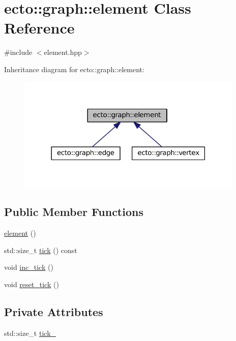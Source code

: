 \hypertarget{classecto_1_1graph_1_1element}{}\section{ecto\+:\+:graph\+:\+:element Class Reference}
\label{classecto_1_1graph_1_1element}


{\ttfamily \#include $<$element.\+hpp$>$}



Inheritance diagram for ecto\+:\+:graph\+:\+:element\+:\nopagebreak
\begin{figure}[H]
\begin{center}
\leavevmode
\includegraphics[width=306pt]{classecto_1_1graph_1_1element__inherit__graph}
\end{center}
\end{figure}
\subsection*{Public Member Functions}
\begin{DoxyCompactItemize}
\item 
\hyperlink{classecto_1_1graph_1_1element_abf5d2137a1fd29f25af2b8f6bd0397df}{element} ()
\item 
std\+::size\+\_\+t \hyperlink{classecto_1_1graph_1_1element_a966b0c7cd87bdc5c5787d9b110966d8f}{tick} () const 
\item 
void \hyperlink{classecto_1_1graph_1_1element_a5d5b283bacb5371285e27c0f42e54985}{inc\+\_\+tick} ()
\item 
void \hyperlink{classecto_1_1graph_1_1element_a6417601ffd8159b6e00f2ff57eda1b99}{reset\+\_\+tick} ()
\end{DoxyCompactItemize}
\subsection*{Private Attributes}
\begin{DoxyCompactItemize}
\item 
std\+::size\+\_\+t \hyperlink{classecto_1_1graph_1_1element_a6f850cead9edb37941344fdbd40ae112}{tick\+\_\+}
\end{DoxyCompactItemize}


